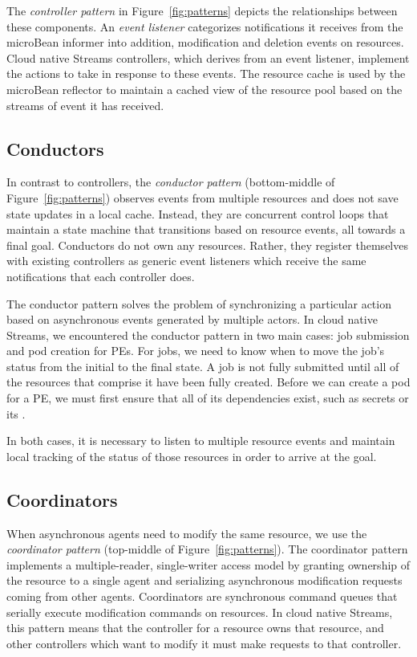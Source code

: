 The \emph{controller pattern} in Figure~\ref{fig:patterns} depicts the
relationships between these components. An \emph{event listener}
categorizes notifications it receives from the microBean informer into addition,
modification and deletion events on resources. Cloud native Streams
controllers, which derives from an event listener, implement the actions
to take in response to these events. The resource cache is used by the microBean
reflector to maintain a cached view of the resource pool based on the streams of
event it has received.

\subsection{Conductors}
\label{sec:conductor}

In contrast to controllers, the \emph{conductor pattern} (bottom-middle of
Figure~\ref{fig:patterns}) observes events from multiple resources and does not
save state updates in a local cache. Instead, they are concurrent control loops
that maintain a state machine that transitions based on resource events, all
towards a final goal. Conductors do not own any resources. Rather, they register
themselves with existing controllers as generic event listeners which receive
the same notifications that each controller does.

The conductor pattern solves the problem of synchronizing a particular action
based on asynchronous events generated by multiple actors. In cloud native
Streams, we encountered the conductor pattern in two main cases: job submission
and pod creation for PEs. For jobs, we need to know when to move the job's
status from the initial  to the final  state.
A job is not fully submitted until all of the resources that comprise it have
been fully created. Before we can create a pod for a PE, we must first ensure
that all of its dependencies exist, such as secrets or its .

In both cases, it is necessary to listen to multiple resource events and
maintain local tracking of the status of those resources in order to arrive at
the goal.

\subsection{Coordinators}
\label{sec:coordinator}

When asynchronous agents need to modify the same resource, we use the
\emph{coordinator pattern} (top-middle of Figure~\ref{fig:patterns}). The
coordinator pattern implements a multiple-reader, single-writer access model by
granting ownership of the resource to a single agent and serializing
asynchronous modification requests coming from other agents. Coordinators are
synchronous command queues that serially execute modification commands on
resources. In cloud native Streams, this pattern means that the controller for a
resource owns that resource, and other controllers which want to modify it must
make requests to that controller.

